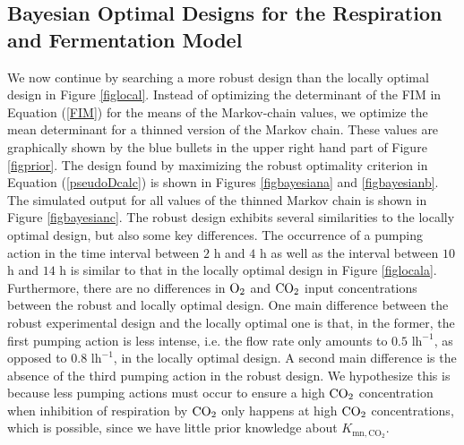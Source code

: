 \subsection{Bayesian Optimal Designs for the Respiration and Fermentation Model}
We now continue by searching a more robust design than the locally optimal design in Figure \ref{figlocal}. Instead of optimizing the determinant of the FIM in Equation (\ref{FIM}) for the means of the Markov-chain values, we optimize the mean determinant for a thinned version of the Markov chain. These values are graphically shown by the blue bullets in the upper right hand part of Figure \ref{figprior}. The design found by maximizing the robust optimality criterion in Equation (\ref{pseudoDcalc}) is shown in Figures \ref{figbayesiana} and \ref{figbayesianb}. The simulated output for all values of the thinned Markov chain is shown in Figure \ref{figbayesianc}. The robust design exhibits several similarities to the locally optimal design, but also some key differences. The occurrence of a pumping action in the time interval between $2$ h and $4$ h as well as the interval between $10$ h and $14$ h is similar to that in the locally optimal design in Figure \ref{figlocala}. Furthermore, there are no differences in $\text{O}_2$ and $\text{CO}_2$ input concentrations between the robust and locally optimal design. One main difference between the robust experimental design and the locally optimal one is that, in the former, the first pumping action is less intense, i.e. the flow rate only amounts to $0.5$ l$\text{h}^{-1}$, as opposed to  $0.8$ l$\text{h}^{-1}$, in the locally optimal design. A second main difference is the absence of the third pumping action in the robust design. We hypothesize this is because  less pumping actions must occur to ensure a high $\text{CO}_2$ concentration when inhibition of respiration by $\text{CO}_2$ only happens at high $\text{CO}_2$ concentrations, which is possible, since we have little prior knowledge about $K_{\text{mn},\text{CO}_2}$.
